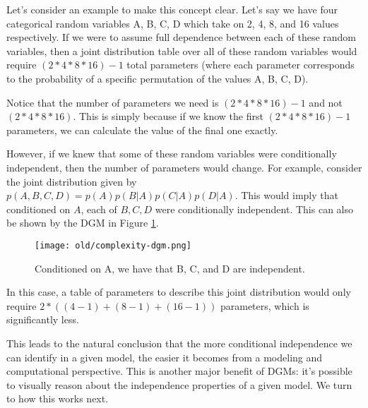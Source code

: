 Let's consider an example to make this concept clear. Let's say we have four categorical random variables A, B, C, D which take on 2, 4, 8, and 16 values respectively. If we were to assume full dependence between each of these random variables, then a joint distribution table over all of these random variables would require $(2 * 4 * 8 * 16) - 1$ total parameters (where each parameter corresponds to the probability of a specific permutation of the values A, B, C, D).

\begin{warning}
    Notice that the number of parameters we need is $(2 * 4 * 8 * 16) - 1$ and not $(2 * 4 * 8 * 16)$. This is simply because if we know the first $(2 * 4 * 8 * 16) - 1$ parameters, we can calculate the value of the final one exactly.
\end{warning}

However, if we knew that some of these random variables were conditionally independent, then the number of parameters would change. For example, consider the joint distribution given by $p(A, B, C, D) = p(A)p(B|A)p(C|A)p(D|A)$. This would imply that conditioned on $A$, each of $B, C, D$ were conditionally independent. This can also be shown by the DGM in Figure \ref{fig:complexity-dgm}.
\begin{figure}
	\centering
	\texttt{[image: old/complexity-dgm.png]}
    \caption{Conditioned on A, we have that B, C, and D are independent.}
	\label{fig:complexity-dgm}
\end{figure}

In this case, a table of parameters to describe this joint distribution would only require $2 * ((4 - 1) + (8 - 1) + (16 - 1))$ parameters, which is significantly less.

This leads to the natural conclusion that the more conditional independence we can identify in a given model, the easier it becomes from a modeling and computational perspective. This is another major benefit of DGMs: it's possible to visually reason about the independence properties of a given model. We turn to how this works next.

